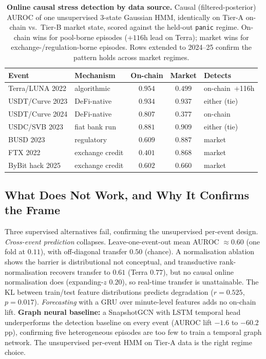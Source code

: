 \documentclass[sigconf,anonymous]{acmart}
\begin{document}
\begin{table}[t]
\centering
\caption{\textbf{Online causal stress detection by data source.}  Causal (filtered-posterior) AUROC of one unsupervised 3-state Gaussian HMM, identically on Tier-A on-chain vs.\ Tier-B market state, scored against the held-out \texttt{panic} regime.  On-chain wins for pool-borne episodes ($+116$h lead on Terra); market wins for exchange-/regulation-borne episodes. Rows extended to 2024--25 confirm the pattern holds across market regimes.}
\label{tab:detection}
\small
\setlength{\tabcolsep}{2pt}
\begin{tabular}{llccl}
\toprule
Event & Mechanism & On-chain & Market & Detects \\
\midrule
Terra/LUNA 2022   & algorithmic     & $\mathbf{0.954}$ & $0.499$ & on-chain~$+$116h \\
USDT/Curve 2023   & DeFi-native     & $0.934$ & $0.937$ & either (tie) \\
USDT/Curve 2024   & DeFi-native     & $\mathbf{0.807}$ & $0.377$ & on-chain \\
USDC/SVB 2023     & fiat bank run   & $0.881$ & $0.909$ & either (tie) \\
\midrule
BUSD 2023         & regulatory      & $0.609$ & $\mathbf{0.887}$ & market \\
FTX 2022          & exchange credit & $0.401$ & $\mathbf{0.868}$ & market \\
ByBit hack 2025   & exchange credit & $0.602$ & $\mathbf{0.660}$ & market \\
\bottomrule
\end{tabular}
\end{table}


\subsection{What Does Not Work, and Why It Confirms the Frame}
\label{sec:ml-diagnosis}

Three supervised alternatives fail, confirming the unsupervised per-event design.
\emph{Cross-event prediction} collapses. Leave-one-event-out mean AUROC $\approx0.60$
(one fold at $0.11$), with off-diagonal transfer $0.50$ (chance). A normalisation ablation shows the
barrier is distributional not conceptual, and transductive rank-normalisation recovers transfer to $0.61$
(Terra $0.77$), but no causal online normalisation does (expanding-$z$ $0.20$), so real-time transfer
is unattainable.  The KL between train/test feature distributions predicts degradation ($r=0.525$,
$p=0.017$).  \emph{Forecasting} with a GRU over minute-level features adds no on-chain lift.
\textbf{Graph neural baseline:} a SnapshotGCN with LSTM temporal head
underperforms the detection baseline on every event (AUROC lift $-1.6$ to $-60.2$\,pp),
confirming five heterogeneous episodes are too few to train a temporal graph network.
The unsupervised per-event HMM on Tier-A data is the right regime choice.
\end{document}
